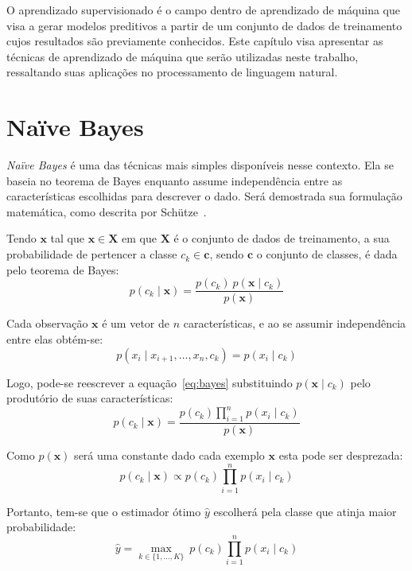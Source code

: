 O aprendizado supervisionado é o campo dentro de aprendizado de máquina que visa a gerar modelos preditivos a partir de
um conjunto de dados de treinamento cujos resultados são previamente conhecidos.
Este capítulo visa apresentar as técnicas de aprendizado de máquina que serão utilizadas neste trabalho, ressaltando
suas aplicações no processamento de linguagem natural.

\section{Naïve Bayes} \label{sec:bayes}

\textit{Naïve Bayes} é uma das técnicas mais simples disponíveis nesse contexto.
Ela se baseia no teorema de Bayes enquanto assume independência entre as características escolhidas para descrever o
dado.
Será demostrada sua formulação matemática, como descrita por Schütze~\cite{schutze08}.

Tendo $\mathbf{x}$ tal que $\mathbf{x} \in \mathbf{X}$ em que $\mathbf{X}$ é o conjunto de dados de treinamento, a sua
probabilidade de pertencer a classe $c_k \in \mathbf{c}$, sendo $\mathbf{c}$ o conjunto de classes, é dada pelo teorema de Bayes:
\begin{equation} \label{eq:bayes}
    p(c_k \mid \mathbf{x}) = \frac{p(c_k) \ p(\mathbf{x} \mid c_k)}{p(\mathbf{x})}
\end{equation}

Cada observação $\mathbf{x}$ é um vetor de $n$ características, e ao se assumir independência entre elas obtém-se:
\begin{equation}
    p(x_i \mid x_{i+1}, \dots ,x_{n}, c_k ) = p(x_i \mid c_k)
\end{equation}

Logo, pode-se reescrever a equação~\ref{eq:bayes} substituindo $p(\mathbf{x} \mid c_k)$ pelo produtório de suas
características:
\begin{equation}
    p(c_k \mid \mathbf{x}) = \frac{p(c_k) \prod_{i=1}^n p(x_i \mid c_k)}{p(\mathbf{x})}
\end{equation}

Como $p(\mathbf{x})$ será uma constante dado cada exemplo $\mathbf{x}$ esta pode ser desprezada:
\begin{equation}
    p(c_k \mid \mathbf{x}) \propto p(c_k) \prod_{i=1}^n p(x_i \mid c_k)
\end{equation}

Portanto, tem-se que o estimador ótimo $\hat{y}$ escolherá pela classe que atinja maior probabilidade:
\begin{equation}
    \hat{y} = \underset{k \in \{1, \dots, K\}}{\operatorname{max}} \ p(c_k) \displaystyle\prod_{i=1}^n p(x_i \mid c_k)
\end{equation}

